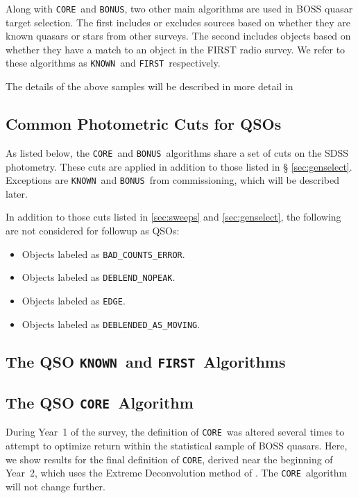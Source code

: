 \documentclass[12pt,preprint]{aastex}
\newcommand{\core}{\texttt{CORE}}
\newcommand{\bonus}{\texttt{BONUS}}
\newcommand{\known}{\texttt{KNOWN}}
\newcommand{\first}{\texttt{FIRST}}
\begin{document}
Along with \core\ and \bonus, two other main algorithms are used in BOSS
quasar target selection. The first includes or excludes sources based on
whether they are known quasars or stars from other surveys. The second
includes objects based on whether they have a match to an object in the
FIRST radio survey. We refer to these algorithms as \known\ and \first\
respectively.  

The details of the above samples will be described in more detail in


\subsection{Common Photometric Cuts for QSOs}

As listed below, the \core\ and \bonus\ algorithms share a set of cuts on the
SDSS photometry. These cuts are applied in addition to those listed in \S
\ref{sec:genselect}. Exceptions are \known\ and \bonus\ from commissioning,
which will be described later.

In addition to those cuts listed in \ref{sec:sweeps} and \ref{sec:genselect},
the following are not considered for followup as QSOs:

\begin{itemize}

    \item Objects labeled as \texttt{BAD\_COUNTS\_ERROR}.
    \item Objects labeled as \texttt{DEBLEND\_NOPEAK}.
    \item Objects labeled as \texttt{EDGE}.
    \item Objects labeled as \texttt{DEBLENDED\_AS\_MOVING}.

\end{itemize}

\subsection{The QSO \known\ and \first\ Algorithms} \label{sec:knownfirst}

\subsection{The QSO \core\ Algorithm}

During Year~1 of the survey, the definition of \core\ was altered several times
to attempt to optimize return within the statistical sample of BOSS quasars.
Here, we show results for the final definition of \core, derived near the
beginning of Year~2, which uses the Extreme Deconvolution method of
\citet{BovyQSOPhotoz2011}.  The \core\ algorithm will not change further.
\end{document}

